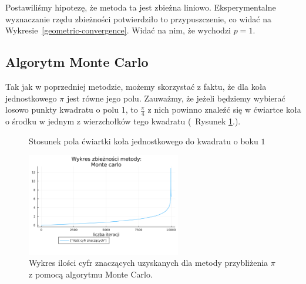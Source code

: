Postawiliśmy hipotezę, że metoda ta jest zbieżna liniowo. Eksperymentalne wyznaczanie rzędu zbieżności potwierdziło to przypuszczenie, co widać na Wykresie~\ref{geometric-convergence}. Widać na nim, że wychodzi $p = 1$.

\subsection{Algorytm Monte Carlo}

Tak jak w poprzedniej metodzie, możemy skorzystać z faktu, że dla koła jednostkowego $\pi$ jest równe jego polu. Zauważmy, że jeżeli będziemy wybierać losowo punkty kwadratu o polu 1, to $\frac\pi4$ z nich powinno znaleźć się w ćwiartce koła o środku w jednym z wierzchołków tego kwadratu (~Rysunek \ref{fig:monte-carlo}.).

\begin{figure}[!h]\centering
{}
\caption{Stosunek pola ćwiartki koła jednostkowego do kwadratu o boku $1$}
\label{fig:monte-carlo}
\end{figure}

\begin{figure}[!h]\centering
    \renewcommand{\figurename}{Wykres}
    \includegraphics[width=0.6\textwidth]{../prog/monte_carlo_log_error.png}
    \caption{Wykres ilości cyfr znaczących uzyskanych dla metody przybliżenia $\pi$ z pomocą algorytmu Monte Carlo.}
    \label{monte-carlo-error}
\end{figure}
    
